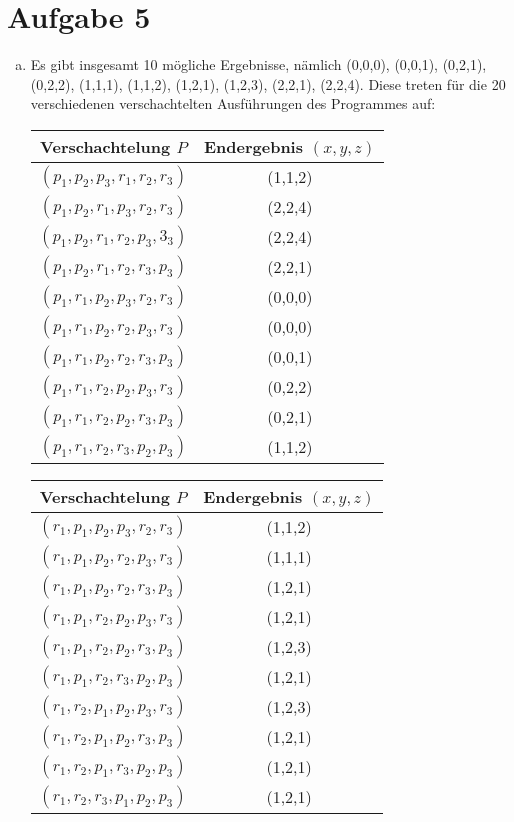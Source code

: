 \documentclass[numbers=noendperiod]{scrartcl}
\begin{document}
\section*{Aufgabe 5}
\begin{enumerate}[a)]
	\item Es gibt insgesamt 10 mögliche Ergebnisse, nämlich (0,0,0), (0,0,1), (0,2,1), (0,2,2), (1,1,1), (1,1,2), (1,2,1), (1,2,3), (2,2,1), (2,2,4). Diese treten für die 20 verschiedenen verschachtelten Ausführungen des Programmes auf:
	
	\begin{tabular}{|c|c|}
		\hline Verschachtelung $P$ & Endergebnis $(x,y,z)$\\\hline
		$(p_1, p_2, p_3, r_1, r_2, r_3)$ & (1,1,2)\\
		$(p_1, p_2, r_1, p_3, r_2, r_3)$ & (2,2,4)\\
		$(p_1, p_2, r_1, r_2, p_3, 3_3)$ & (2,2,4)\\
		$(p_1, p_2, r_1, r_2, r_3, p_3)$ & (2,2,1)\\
		$(p_1, r_1, p_2, p_3, r_2, r_3)$ & (0,0,0)\\
		$(p_1, r_1, p_2, r_2, p_3, r_3)$ & (0,0,0)\\
		$(p_1 ,r_1, p_2, r_2, r_3, p_3)$ & (0,0,1)\\
		$(p_1, r_1, r_2, p_2, p_3, r_3)$ & (0,2,2)\\
		$(p_1, r_1, r_2, p_2, r_3, p_3)$ & (0,2,1)\\
		$(p_1, r_1, r_2, r_3, p_2, p_3)$ & (1,1,2)\\\hline
	\end{tabular}
	\begin{tabular}{|c|c|}
		\hline Verschachtelung $P$ & Endergebnis $(x,y,z)$\\\hline
		$(r_1, p_1, p_2, p_3, r_2, r_3)$ & (1,1,2)\\
		$(r_1, p_1, p_2, r_2, p_3, r_3)$ & (1,1,1)\\
		$(r_1, p_1, p_2, r_2, r_3, p_3)$ & (1,2,1)\\
		$(r_1, p_1, r_2, p_2, p_3, r_3)$ & (1,2,1)\\
		$(r_1, p_1, r_2, p_2, r_3, p_3)$ & (1,2,3)\\
		$(r_1, p_1, r_2, r_3, p_2, p_3)$ & (1,2,1)\\
		$(r_1, r_2, p_1, p_2, p_3, r_3)$ & (1,2,3)\\
		$(r_1, r_2, p_1, p_2, r_3, p_3)$ & (1,2,1)\\
		$(r_1, r_2, p_1, r_3, p_2, p_3)$ & (1,2,1)\\
		$(r_1, r_2, r_3, p_1, p_2, p_3)$ & (1,2,1)\\\hline
	\end{tabular}
	

\end{enumerate}
\end{document}
